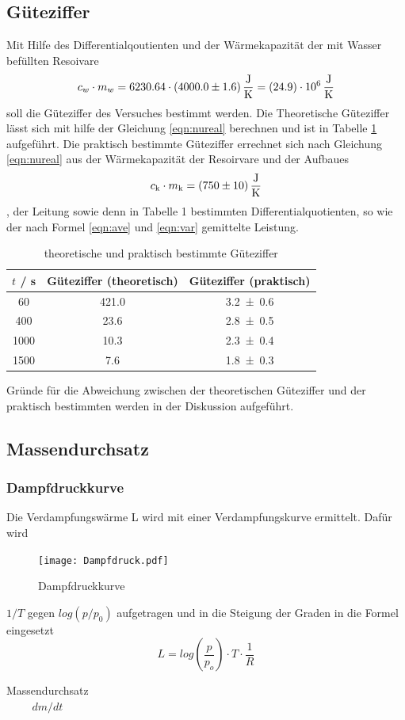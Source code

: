 \subsection{Güteziffer}
Mit Hilfe des Differentialqoutienten und der Wärmekapazität der mit Wasser befüllten Resoivare
\begin{equation}
  c_w \cdot m_w = 6230.64 \cdot (\num{4000 +- 1.6}) \, \frac{\text{J}}{\text{K}} = (\num{24.9 +- 0.0}) \cdot 10^6 \, \frac{\text{J}}{\text{K}}
  \label{eqn:WC}
\end{equation}
soll die Güteziffer des Versuches bestimmt werden. Die Theoretische Güteziffer lässt sich mit hilfe der Gleichung \ref{eqn:nureal} berechnen und ist in Tabelle \ref{tab:gueteziffer} aufgeführt. Die praktisch bestimmte Güteziffer errechnet sich nach Gleichung \ref{eqn:nureal} aus der Wärmekapazität der Resoirvare und der Aufbaues 
\begin{equation}
  c_{\text{k}} \cdot m_{\text{k}} = (\num{750 +- 10}) \, \frac{\text{J}}{\text{K}}
  \label{eqn:Res}
\end{equation}
, der Leitung sowie denn in Tabelle 1 bestimmten Differentialquotienten, so wie der nach Formel \ref{eqn:ave} und \ref{eqn:var} gemittelte Leistung.
\begin{table}
  \centering
  \begin{tabular}{c c c}
    \toprule
    $t$ / s & Güteziffer (theoretisch) & Güteziffer (praktisch) \\
    \midrule
    60	 & 421.0 & \num{3.2 +- 0.6} 	\\
    400  & 23.6	 & \num{2.8 +- 0.5} 	\\
    1000 & 10.3	 & \num{2.3 +- 0.4}	\\
    1500 & 7.6	 & \num{1.8 +- 0.3} 	\\
    \bottomrule
  \end{tabular}
  \caption{theoretische und praktisch bestimmte Güteziffer}
  \label{tab:gueteziffer}
\end{table}
Gründe für die Abweichung zwischen der theoretischen Güteziffer und der praktisch bestimmten werden in der Diskussion aufgeführt.
\subsection{Massendurchsatz}
\subsubsection{Dampfdruckkurve}
Die Verdampfungswärme L wird mit einer Verdampfungskurve ermittelt. Dafür wird
\begin{figure}
  \centering
  \texttt{[image: Dampfdruck.pdf]}
  \caption{Dampfdruckkurve}
  \label{fig:dampfdruck}
\end{figure}
$1/T$ gegen $log(p/p_0)$ aufgetragen und in die Steigung der Graden in die Formel eingesetzt 
\begin{equation}
  L = log \left( \frac{p}{p_o} \right) \cdot T \cdot \frac{1}{R} 
  \label{eqn:dampfgl}
\end{equation}

\begin{table}
  \centering
  \begin{tabular}{c c c}
    \toprule
  \end{tabular}
  \caption{Massendurchsatz $dm/dt$}
  \label{tab:dm/dt}
\end{table}
